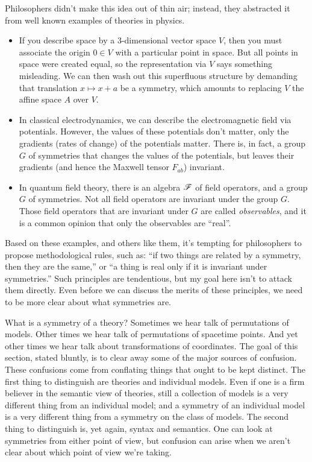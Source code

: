 Philosophers didn't make this idea out of thin air; instead, they
abstracted it from well known examples of theories in physics.
\begin{itemize}
\item If you describe space by a $3$-dimensional vector space $V$,
  then you must associate the origin $0\in V$ with a particular point
  in space.  But all points in space were created equal, so the
  representation via $V$ says something misleading.  We can then wash
  out this superfluous structure by demanding that translation
  $x\mapsto x+a$ be a symmetry, which amounts to replacing $V$ the
  affine space $A$ over $V$.
\item In classical electrodynamics, we can describe the
  electromagnetic field via potentials.  However, the values of these
  potentials don't matter, only the gradients (rates of change) of the
  potentials matter.  There is, in fact, a group $G$ of symmetries
  that changes the values of the potentials, but leaves their
  gradients (and hence the Maxwell tensor $F_{ab}$) invariant.
\item In quantum field theory, there is an algebra $\mathscr F$ of field
  operators, and a group $G$ of symmetries.  Not all field operators
  are invariant under the group $G$.  Those field operators that are
  invariant under $G$ are called {\it observables}, and it is a common
  opinion that only the observables are ``real''.
\end{itemize}
Based on these examples, and others like them, it's tempting for
philosophers to propose methodological rules, such as: ``if two things
are related by a symmetry, then they are the same,'' or ``a thing is
real only if it is invariant under symmetries.''  Such principles are
tendentious, but my goal here isn't to attack them directly.  Even
before we can discuss the merits of these principles, we need to be
more clear about what symmetries are.

What is a symmetry of a theory?  Sometimes we hear talk of
permutations of models.  Other times we hear talk of permutations of
spacetime points.  And yet other times we hear talk about
transformations of coordinates.  The goal of this section, stated
bluntly, is to clear away some of the major sources of confusion.
These confusions come from conflating things that ought to be kept
distinct.  The first thing to distinguish are theories and individual
models.  Even if one is a firm believer in the semantic view of
theories, still a collection of models is a very different thing from
an individual model; and a symmetry of an individual model is a very
different thing from a symmetry on the class of models.  The second
thing to distinguish is, yet again, syntax and semantics.  One can
look at symmetries from either point of view, but confusion can arise
when we aren't clear about which point of view we're taking.


